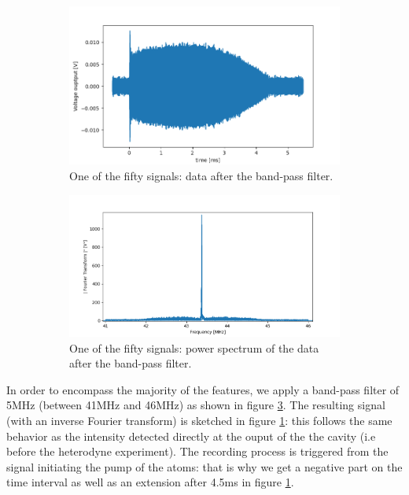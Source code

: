 \documentclass[11pt]{report}
\begin{document}
\begin{figure}[h!]
\centering
\begin{subfigure}{.48\textwidth}
  \centering
  \includegraphics[width=1.1\linewidth]{sp-f-bpf}
  \caption{One of the fifty signals: data after the band-pass filter.}
  \label{fig:sp-f-bpf}
\end{subfigure}%
\hspace{1em}%
\begin{subfigure}{.48\textwidth}
  \centering
  \includegraphics[width=1.1\linewidth]{sp-fft-bpf}
  \caption{One of the fifty signals: power spectrum of the data after the band-pass filter.}
  \label{fig:sp-fft-bpf}
\end{subfigure}
\caption{}
\end{figure}

In order to encompass the majority of the features, we apply a band-pass filter of 5MHz (between 41MHz and 46MHz) as shown in figure \ref{fig:sp-fft-bpf}. The resulting signal (with an inverse Fourier transform) is sketched in figure \ref{fig:sp-f-bpf}: this follows the same behavior as the intensity detected directly at the ouput of the the cavity (i.e before the heterodyne experiment). The recording process is triggered from the signal initiating the pump of the atoms: that is why we get a negative part on the time interval as well as an extension after 4.5ms in figure \ref{fig:sp-f-bpf}.
\end{document}
